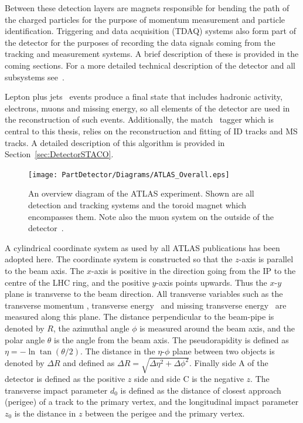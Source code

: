 Between these detection layers are magnets responsible for bending the path of the charged particles for the purpose of momentum measurement and particle identification. Triggering and data acquisition (TDAQ) systems also form part of the detector for the purposes of recording the data signals coming from the tracking and measurement systems. A brief description of these is provided in the coming sections. For a more detailed technical description of the detector and all subsystems see~\cite{Detector:ATLASExperimentGeneral}.

Lepton plus jets \ttbar\ events produce a final state that includes hadronic activity, electrons, muons and missing energy, so all elements of the detector are used in the reconstruction of such events. Additionally, the match \xsm\ tagger which is central to this thesis, relies on the reconstruction and fitting of ID tracks and MS tracks. A detailed description of this algorithm is provided in Section~\ref{sec:DetectorSTACO}.

\begin{figure}[htbp]
  \centering
    \texttt{[image: PartDetector/Diagrams/ATLAS\_Overall.eps]}
    \caption[An overview diagram of the ATLAS experiment. Shown are all detection and tracking systems and the toroid magnet which encompasses them. Note also the muon system on the outside of the detector.]{An overview diagram of the ATLAS experiment. Shown are all detection and tracking systems and the toroid magnet which encompasses them. Note also the muon system on the outside of the detector~\cite{Detector:ATLASExperimentGeneral}.}
  \label{fig:ATLASOverviewFigure}
\end{figure}

A cylindrical coordinate system as used by all ATLAS publications has been adopted here. The coordinate system is constructed so that the $z$-axis is parallel to the beam axis. The $x$-axis is positive in the direction going from the IP to the centre of the LHC ring, and the positive $y$-axis points upwards. Thus the $x$-$y$ plane is transverse to the beam direction. All transverse variables such as the transverse momentum \pt, transverse energy \Et\ and missing transverse energy \met\ are measured along this plane. The distance perpendicular to the beam-pipe is denoted by $R$, the azimuthal angle $\phi$ is measured around the beam axis, and the polar angle $\theta$ is the angle from the beam axis. The pseudorapidity is defined as $\eta=-\ln\tan(\theta/2)$. The distance in the $\eta$-$\phi$ plane between two objects is denoted by $\Delta R$ and defined as $\Delta R = \sqrt{\Delta\eta^{2}+\Delta\phi^{2}}$. Finally side A of the detector is defined as the positive $z$ side and side C is the negative $z$.  The transverse impact parameter $d_{0}$ is defined as the distance of closest approach (perigee) of a track to the primary vertex, and the longitudinal impact parameter $z_{0}$ is the distance in $z$ between the perigee and the primary vertex.

